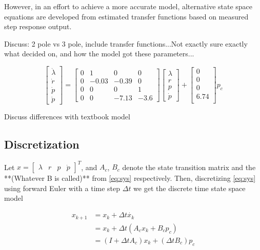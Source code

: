 However, in an effort to achieve a more accurate model, alternative state space equations are developed from estimated transfer functions based on measured step response output.

Discuss: 2 pole vs 3 pole, include transfer functions...Not exactly sure exactly what decided on, and how the model got these parameters...

\begin{equation}
	\begin{bmatrix}
		\dot{\lambda}\\
		\dot{r}\\
		\dot{p}\\
		\ddot{p}
	\end{bmatrix} = 
	\begin{bmatrix}
		0 & 1 & 0 & 0 \\
		0 & -0.03 & -0.39 & 0 \\
		0 & 0 & 0 & 1 \\
		0 & 0 & -7.13 & -3.6
	\end{bmatrix}
	\begin{bmatrix}
		\lambda	\\
		r		\\
		p		\\
		\dot{p}
	\end{bmatrix} +
	\begin{bmatrix}
		0 \\
		0 \\
		0 \\
		6.74 \\
	\end{bmatrix}
	p_c
	\label{eq:sys}
\end{equation}

Discuss differences with textbook model

\subsection{Discretization}
Let $x = \begin{bmatrix}\lambda&r&p&\dot{p}\end{bmatrix}^T$, and $A_c$, $B_c$ denote the state transition matrix and the **(Whatever B is called)** from \eqref{eq:sys} respectively. Then, discretizing \eqref{eq:sys} using forward Euler with a time step $\Delta t$ we get the discrete time state space model

\begin{align}
	x_{k+1} &= x_k + \Delta t \dot{x_k} \\
			&= x_k + \Delta t (A_c x_k + B_c p_c)\\
			&= (I + \Delta t A_c) x_k + (\Delta t B_c) p_c
\end{align}

